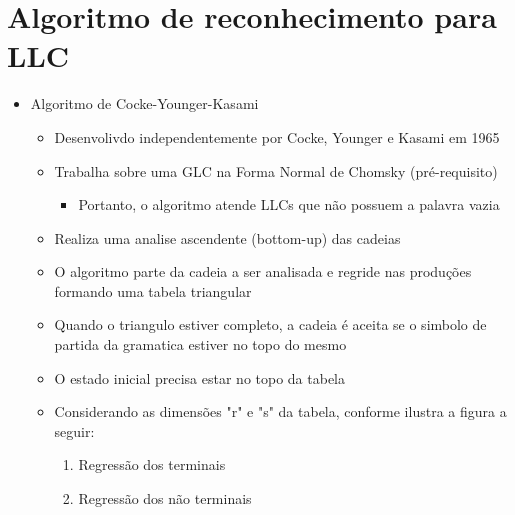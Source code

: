 \documentclass[12pt]{article}
\begin{document}
\section{Algoritmo de reconhecimento para LLC}
\begin{itemize}
    \item Algoritmo de Cocke-Younger-Kasami
    \begin{itemize}
        \item Desenvolivdo independentemente por Cocke, Younger e Kasami em 1965
        \item Trabalha sobre uma GLC na Forma Normal de Chomsky (pré-requisito)
        \begin{itemize}
            \item Portanto, o algoritmo atende LLCs que não possuem a palavra 
            vazia
        \end{itemize}
        \item Realiza uma analise ascendente (bottom-up) das cadeias
        \item O algoritmo parte da cadeia a ser analisada e regride nas produções 
        formando uma tabela triangular
        \item Quando o triangulo estiver completo, a cadeia é aceita se o simbolo 
        de partida da gramatica estiver no topo do mesmo
        \item O estado inicial precisa estar no topo da tabela
        \item Considerando as dimensões "r" e "s" da tabela, conforme ilustra 
        a figura a seguir:
        \begin{enumerate}
            \item Regressão dos terminais
            \item Regressão dos não terminais
        \end{enumerate}
    \end{itemize}
\end{itemize}
\end{document}
